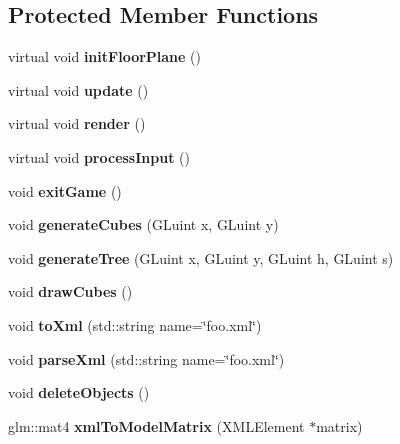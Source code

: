 \subsection*{Protected Member Functions}
\begin{DoxyCompactItemize}
\item 
\mbox{\label{class_game_a404edbd2948699478b9d1ae7d35ee053}} 
virtual void {\bfseries init\+Floor\+Plane} ()
\item 
\mbox{\label{class_game_a79df6376b332d63c9eca0dcee30305c3}} 
virtual void {\bfseries update} ()
\item 
\mbox{\label{class_game_a15ddd769261d923827a3cdf41499c843}} 
virtual void {\bfseries render} ()
\item 
\mbox{\label{class_game_a815a3ec2787b4b1c4077d28165c380e8}} 
virtual void {\bfseries process\+Input} ()
\item 
\mbox{\label{class_game_ad1945c922f49185fe91abdfb9faa4c07}} 
void {\bfseries exit\+Game} ()
\item 
\mbox{\label{class_game_af996f68e716869dcb91a5ffecfd150f5}} 
void {\bfseries generate\+Cubes} (G\+Luint x, G\+Luint y)
\item 
\mbox{\label{class_game_a608ac4d977202eebc0327efcb1ee90c7}} 
void {\bfseries generate\+Tree} (G\+Luint x, G\+Luint y, G\+Luint h, G\+Luint s)
\item 
\mbox{\label{class_game_af5aa3aaff87a42f81e334104972c3473}} 
void {\bfseries draw\+Cubes} ()
\item 
\mbox{\label{class_game_a993305edd46b0916eafd31aaa206d27a}} 
void {\bfseries to\+Xml} (std\+::string name=\char`\"{}foo.\+xml\char`\"{})
\item 
\mbox{\label{class_game_a81dc1f56c93be17b88014db4776cd5e1}} 
void {\bfseries parse\+Xml} (std\+::string name=\char`\"{}foo.\+xml\char`\"{})
\item 
\mbox{\label{class_game_acb9125370eda8e76458572220a9a8115}} 
void {\bfseries delete\+Objects} ()
\item 
\mbox{\label{class_game_acf4e98e6e791af5429a41143e9c88cb6}} 
glm\+::mat4 {\bfseries xml\+To\+Model\+Matrix} (X\+M\+L\+Element $\ast$matrix)
\end{DoxyCompactItemize}

